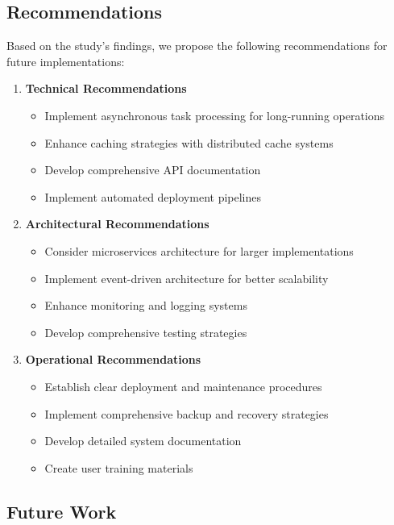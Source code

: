 \documentclass{article}
\begin{document}
\subsection{Recommendations}

Based on the study's findings, we propose the following recommendations for future implementations:

\begin{enumerate}
    \item \textbf{Technical Recommendations}
    \begin{itemize}
        \item Implement asynchronous task processing for long-running operations
        \item Enhance caching strategies with distributed cache systems
        \item Develop comprehensive API documentation
        \item Implement automated deployment pipelines
    \end{itemize}

    \item \textbf{Architectural Recommendations}
    \begin{itemize}
        \item Consider microservices architecture for larger implementations
        \item Implement event-driven architecture for better scalability
        \item Enhance monitoring and logging systems
        \item Develop comprehensive testing strategies
    \end{itemize}

    \item \textbf{Operational Recommendations}
    \begin{itemize}
        \item Establish clear deployment and maintenance procedures
        \item Implement comprehensive backup and recovery strategies
        \item Develop detailed system documentation
        \item Create user training materials
    \end{itemize}
\end{enumerate}

\subsection{Future Work}
\end{document}
